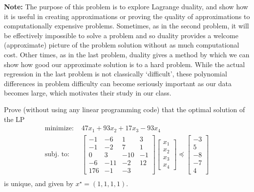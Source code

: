 \documentclass[12pt,letterpaper,cm]{hmcpset}
\newcommand\m[1]{\begin{bmatrix} #1 \end{bmatrix}}
\begin{document}
\textbf{Note:} The purpose of this problem is to explore Lagrange duality, and show how it is useful in creating approximations or proving the quality of approximations to computationally expensive problems. Sometimes, as in the second problem, it will be effectively impossible to solve a problem and so duality provides a welcome (approximate) picture of the problem solution without as much computational cost. Other times, as in the last problem, duality gives a method by which we can show how good our approximate solution is to a hard problem. While the actual regression in the last problem is not classically `difficult', these polynomial differences in problem difficulty can become seriously important as our data becomes large, which motivates their study in our class.

\begin{problem}[Boyd 5.28]
    Prove (without using any linear programming code) that the optimal solution of the LP
    \begin{align*}
        \text{minimize: } & 47 x_1 + 93 x_2 + 17x_3 - 93 x_4\\
        \text{subj. to: } & \m{-1&-6&1&3\\-1&-2&7&1\\0&3&-10&-1\\-6&-11&-2&12\\176&-1&-3}\m{x_1\\x_2\\x_3\\x_4}\preceq \m{-3\\5\\-8\\-7\\4}\\
    \end{align*}
    is unique, and given by $x^\star = (1,1,1,1)$.
\end{problem}

\begin{solution}
    \vfill
\end{solution}
\end{document}
